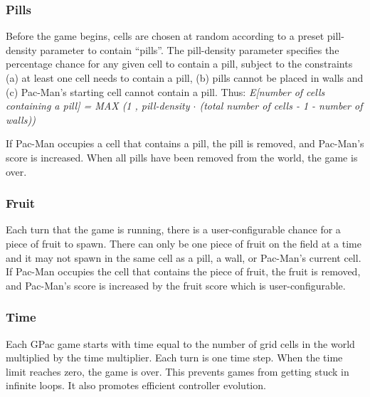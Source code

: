 \documentclass{article}
\begin{document}

\subsubsection*{Pills}
Before the game begins, cells are chosen at random according to a preset pill-density parameter to contain ``pills''. The pill-density parameter specifies the percentage chance for any given cell to contain a pill, subject to the constraints (a) at least one cell needs to contain a pill, (b) pills cannot be placed in walls and (c) Pac-Man's starting cell cannot contain a pill. Thus: \emph{E[number of cells containing a pill] = MAX (1 , pill-density $\cdot$ (total number of cells - 1 - number of walls))}

If Pac-Man occupies a cell that contains a pill, the pill is removed, and Pac-Man's score is increased. When all pills have been removed from the world, the game is over. 

\subsubsection*{Fruit}
Each turn that the game is running, there is a user-configurable chance for a piece of fruit to spawn. There can only be one piece of fruit on the field at a time and it may not spawn in the same cell as a pill, a wall, or Pac-Man's current cell. If Pac-Man occupies the cell that contains the piece of fruit, the fruit is removed, and Pac-Man's score is increased by the fruit score which is user-configurable.

\subsubsection*{Time}
Each GPac game starts with time equal to the number of grid cells in the world multiplied by the time multiplier. Each turn is one time step.  When the time limit reaches zero, the game is over. This prevents games from getting stuck in infinite loops. It also promotes efficient controller evolution.
\end{document}

